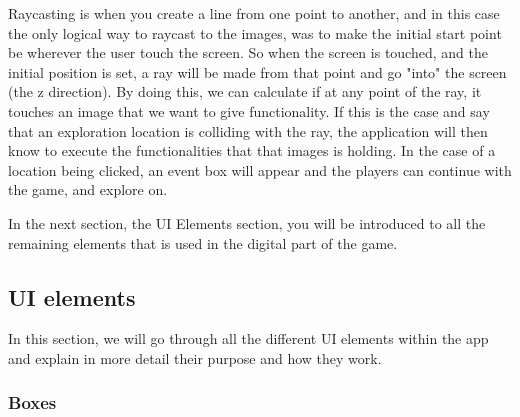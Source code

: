 Raycasting is when you create a line from one point to another, and in this case the only logical way to raycast to the images, was to make the initial start point be wherever the user touch the screen. So when the screen is touched, and the initial position is set, a ray will be made from that point and go "into" the screen (the z direction). By doing this, we can calculate if at any point of the ray, it touches an image that we want to give functionality. If this is the case and say that an exploration location is colliding with the ray, the application will then know to execute the functionalities that that images is holding. In the case of a location being clicked, an event box will appear and the players can continue with the game, and explore on.

In the next section, the UI Elements section, you will be introduced to all the remaining elements that is used in the digital part of the game.


\subsection{UI elements}

In this section, we will go through all the different UI elements within the app and explain in more detail their purpose and how they work.

\subsubsection{Boxes}

